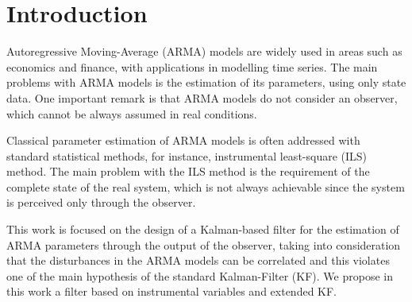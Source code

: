 \section{Introduction}\label{sec:intro}
Autoregressive Moving-Average (ARMA) models are widely used in areas such as economics and finance, with applications in modelling time series. The main problems with ARMA models is the estimation of its parameters, using only state data. One important remark is that ARMA models do not consider an observer, which cannot be always assumed in real conditions.

Classical parameter estimation of ARMA models is often addressed with standard statistical methods, for instance, instrumental least-square (ILS) method. The main problem with the ILS method is the requirement of the complete state of the real system, which is not always achievable since the system is perceived only through the observer.


This work is focused on the design of a Kalman-based filter for the estimation of ARMA parameters through the output of the observer, taking into consideration that the disturbances in the ARMA models can be correlated and this violates one of the main hypothesis of the standard Kalman-Filter (KF). We propose in this work a filter based on instrumental variables and extended KF.
